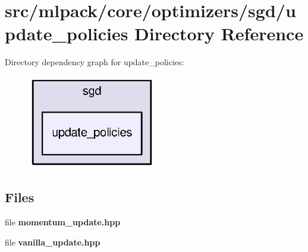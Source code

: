 \section{src/mlpack/core/optimizers/sgd/update\+\_\+policies Directory Reference}
\label{dir_a2d1f95ef1c8cbdf4d9614ae67fe1910}
Directory dependency graph for update\+\_\+policies\+:
\nopagebreak
\begin{figure}[H]
\begin{center}
\leavevmode
\includegraphics[width=160pt]{dir_a2d1f95ef1c8cbdf4d9614ae67fe1910_dep}
\end{center}
\end{figure}
\subsection*{Files}
\begin{DoxyCompactItemize}
\item 
file {\bf momentum\+\_\+update.\+hpp}
\item 
file {\bf vanilla\+\_\+update.\+hpp}
\end{DoxyCompactItemize}
